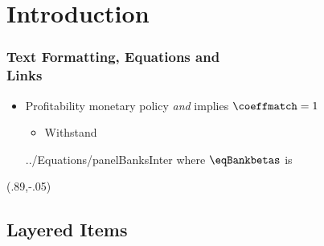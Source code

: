 \documentclass[12pt, aspectratio=169, xcolor=dvipsnames]{beamer}  %
\begin{document}




\section{Introduction}

 \begin{frame}[label=LinkA]
	\frametitle{Text Formatting, Equations and \\ \vspace{-.4cm} Links}
	\begin{itemize}
		\item Profitability \alert{monetary policy} \textit{and} implies \textcolor{red}{$\coeffmatch = 1$}
		\iftoggle{long}{\pause}{}
		\begin{itemize}
			\item Withstand 
		\end{itemize}
	 {../Equations/panelBanksInter}
	\vspace{-0.8cm}
	\quad where $\eqBankbetas$ is
	\end{itemize}
	\begin{textblock*}{3cm}(.89\textwidth,-.05\textheight)
		\hyperlink{LinkB}{}
	\end{textblock*}
\end{frame}

\subsection{Layered Items}
\end{document}
